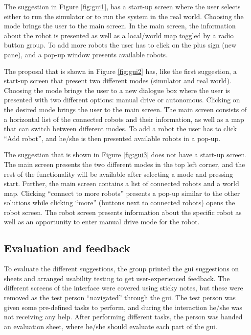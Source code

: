 The suggestion in Figure \ref{fig:gui1}, has a start-up screen where the user selects either to run the simulator or to run the system in the real world. Choosing the mode brings the user to the main screen. In the main screen, the information about the robot is presented as well as a local/world map toggled by a radio button group. To add more robots the user has to click on the plus sign (new pane), and a pop-up window presents available robots.

The proposal that is shown in Figure \ref{fig:gui2} has, like the first suggestion, a start-up screen that present two different modes (simulator and real world). Choosing the mode brings the user to a new dialogue box where the user is presented with two different options: manual drive or autonomous. Clicking on the desired mode brings the user to the main screen. The main screen consists of a horizontal list of the connected robots and their information, as well as a map that can switch between different modes. To add a robot the user has to click ``Add robot'', and he/she is then presented available robots in a pop-up.

The suggestion that is shown in Figure \ref{fig:gui3} does not have a start-up screen. The main screen presents the two different modes in the top left corner, and the rest of the functionality will be available after selecting a mode and pressing start. Further, the main screen contains a list of connected robots and a world map. Clicking ``connect to more robots'' presents a pop-up similar to the other solutions while clicking ``more'' (buttons next to connected robots) opens the robot screen. The robot screen presents information about the specific robot as well as an opportunity to enter manual drive mode for the robot.

\subsection{Evaluation and feedback}
\label{sec:evalandfeedback}
To evaluate the different suggestions, the group printed the \acrshort{gui} suggestions on sheets and arranged usability testing to get user-experienced feedback. The different screens of the interface were covered using sticky notes, but these were removed as the test person ``navigated'' through the \acrshort{gui}. The test person was given some pre-defined tasks to perform, and during the interaction he/she was not receiving any help. After performing different tasks, the person was handed an evaluation sheet, where he/she should evaluate each part of the \acrshort{gui}.

